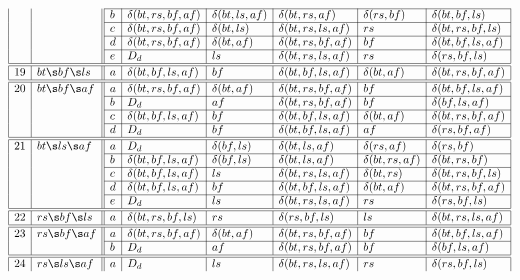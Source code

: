 \begin{table*}[!]
\[\begin{array}{|l|l||l|l|l|l|l|l|}
\cline{3-8} && b & \delta(bt,rs,bf,af) & \delta(bt,ls,af) & \delta(bt,rs,af) & \delta(rs,bf) & \delta(bt,bf,ls)\\
\cline{3-8} && c & \delta(bt,rs,bf,af) & \delta(bt,ls) & \delta(bt,rs,ls,af) & rs & \delta(bt,rs,bf,ls)\\
\cline{3-8} && d & \delta(bt,rs,bf,af) & \delta(bt,af) & \delta(bt,rs,bf,af) & bf & \delta(bt,bf,ls,af)\\
\cline{3-8} && e & D_d & ls & \delta(bt,rs,ls,af) & rs & \delta(rs,bf,ls)\\
\hline \hline
19 & bt\s bf\s ls &
               a & \delta(bt,bf,ls,af) & bf & \delta(bt,bf,ls,af) & \delta(bt,af) & \delta(bt,rs,bf,af)\\
\hline \hline
20 & bt\s bf\s af &
               a & \delta(bt,rs,bf,af) & \delta(bt,af) & \delta(bt,rs,bf,af) & bf & \delta(bt,bf,ls,af)\\
\cline{3-8} && b & D_d & af & \delta(bt,rs,bf,af) & bf & \delta(bf,ls,af)\\
\cline{3-8} && c & \delta(bt,bf,ls,af) & bf & \delta(bt,bf,ls,af) & \delta(bt,af) & \delta(bt,rs,bf,af)\\
\cline{3-8} && d & D_d & bf & \delta(bt,bf,ls,af) & af & \delta(rs,bf,af)\\
\hline \hline
21 & bt\s ls\s af &
               a & D_d & \delta(bf,ls) & \delta(bt,ls,af) & \delta(rs,af)& \delta(rs,bf)\\
\cline{3-8} && b & \delta(bt,bf,ls,af) & \delta(bf,ls) & \delta(bt,ls,af) & \delta(bt,rs,af) & \delta(bt,rs,bf)\\
\cline{3-8} && c & \delta(bt,bf,ls,af) & ls & \delta(bt,rs,ls,af) & \delta(bt,rs) & \delta(bt,rs,bf,ls)\\
\cline{3-8} && d & \delta(bt,bf,ls,af) & bf & \delta(bt,bf,ls,af) & \delta(bt,af) & \delta(bt,rs,bf,af)\\
\cline{3-8} && e & D_d & ls & \delta(bt,rs,ls,af) & rs & \delta(rs,bf,ls)\\
\hline \hline
22 & rs\s bf\s ls &
               a & \delta(bt,rs,bf,ls) & rs & \delta(rs,bf,ls) & ls & \delta(bt,rs,ls,af)\\
\hline \hline
23 & rs\s bf\s af &
               a & \delta(bt,rs,bf,af) & \delta(bt,af) & \delta(bt,rs,bf,af) & bf & \delta(bt,bf,ls,af)\\
\cline{3-8} && b & D_d & af & \delta(bt,rs,bf,af) & bf & \delta(bf,ls,af)\\
\hline \hline
24 & rs\s ls\s af &
               a & D_d & ls & \delta(bt,rs,ls,af) & rs & \delta(rs,bf,ls)\\

\end{array}\]
\end{table*}
